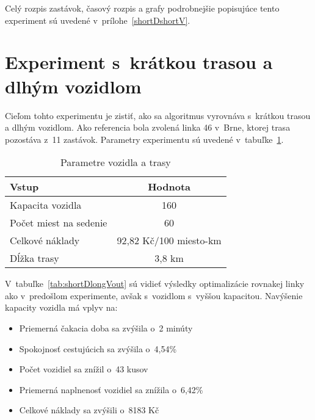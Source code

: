 Celý rozpis zastávok, časový rozpis a grafy podrobnejšie popisujúce tento experiment sú uvedené v~prílohe~\ref{shortDshortV}.

\newpage

\section{Experiment s~krátkou trasou a dlhým vozidlom}
Cieľom tohto experimentu je zistiť, ako sa algoritmus vyrovnáva s~krátkou trasou a dlhým vozidlom.
Ako referencia bola zvolená linka 46 v~Brne, ktorej trasa pozostáva z~11 zastávok.
Parametry experimentu sú uvedené v~tabuľke~\ref{tab:shortDlongVin}.

\begin{table}[h]
  \centering
  \begin{tabular}{|l|c|}
    \hline
    \textbf{Vstup} & \textbf{Hodnota} \\ \hline
    Kapacita vozidla & 160 \\ \hline
    Počet miest na sedenie & 60 \\ \hline
    Celkové náklady & 92,82 Kč/100 miesto-km \\ \hline
    Dĺžka trasy & 3,8 km \\ \hline
  \end{tabular}
  \caption{Parametre vozidla a trasy}
  \label{tab:shortDlongVin}
\end{table}

V~tabuľke~\ref{tab:shortDlongVout} sú vidieť výsledky optimalizácie rovnakej linky ako v~predošlom experimente, avšak s~vozidlom s~vyššou kapacitou.
Navýšenie kapacity vozidla má vplyv na:
\begin{itemize}
  \item Priemerná čakacia doba sa zvýšila o~2 minúty
  \item Spokojnosť cestujúcich sa zvýšila o~4,54\%
  \item Počet vozidiel sa znížil o~43 kusov
  \item Priemerná naplnenosť vozidiel sa znížila o~6,42\%
  \item Celkové náklady sa zvýšili o~8183 Kč
\end{itemize}

